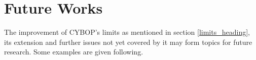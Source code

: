 %
%
%
%
%
%
%

\section{Future Works}
\label{future_works_heading}

The improvement of CYBOP's limits as mentioned in section \ref{limits_heading},
its extension and further issues not yet covered by it may form topics for
future research. Some examples are given following.




%

%


